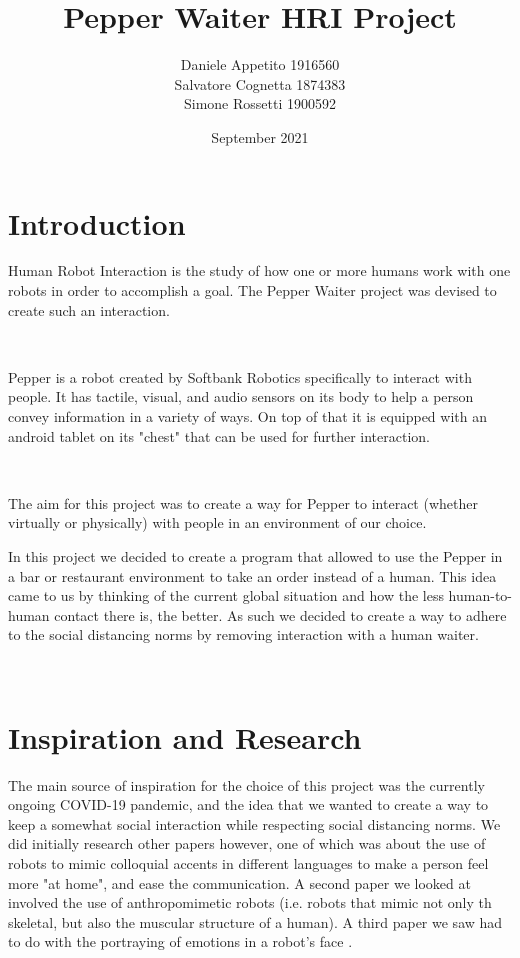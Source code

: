 \documentclass[12pt, letterpaper, twoside]{article}
\title{Pepper Waiter HRI Project}
\author{Daniele Appetito 1916560\\
 Salvatore Cognetta 1874383\\
  Simone Rossetti 1900592}
\date{September 2021}
\begin{document}
\begin{titlepage}
\maketitle
\end{titlepage}

\tableofcontents

\newpage
    
\newpage
\section{Introduction}

Human Robot Interaction is the study of how one or more humans work with one robots in order to accomplish a goal. The Pepper Waiter project was devised to create such an interaction. 

\

Pepper is a robot created by Softbank Robotics specifically to interact with people. It has tactile, visual, and audio sensors on its body to help a person convey  information in a variety of ways. On top of that it is equipped with an android tablet on its "chest" that can be used for further interaction. 

\

The aim for this project was to create a way for Pepper to interact (whether virtually or physically) with people in an environment of our choice. 

In this project we decided to create a program that allowed to use the Pepper in a bar or restaurant environment to take an order instead of a human. This idea came to us by thinking of the current global situation and how the less human-to-human contact there is, the better. As such we decided to create a way to adhere to the social distancing norms by removing interaction with a human waiter. 


\


\section{Inspiration and Research}

The main source of inspiration for the choice of this project was the currently ongoing COVID-19 pandemic, and the idea that we wanted to create a way to keep a somewhat social interaction while respecting social distancing norms. We did initially research other papers however, one of which was about the use of robots to mimic colloquial accents \cite{10.3115/976909.979652} in different languages to make a person feel more "at home", and ease the communication. A second paper we looked at involved the use of anthropomimetic robots \cite{Wittmeier2013TowardAR} (i.e. robots that mimic not only th skeletal, but also the muscular structure of a human). A third paper we saw had to do with the portraying of emotions in a robot's face \cite{BREAZEAL2003119}. 
\end{document}
